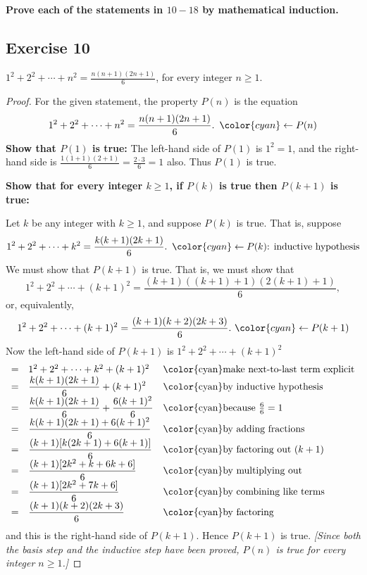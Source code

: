 \documentclass[14pt]{extarticle}
\newcommand{\dps}{\displaystyle}
\newcommand{\from}{\leftarrow}
\newcommand{\cy}{\color{cyan}}
\begin{document}
{\bf\cy Prove each of the statements in $10-18$ by mathematical induction.}

\subsection{Exercise 10}
$\dps 1^2 + 2^2 + \cdots + n^2 = \frac{n(n+1)(2n+1)}{6}$, for every integer $n \geq 1$.

\begin{proof}
    For the given statement, the property $P(n)$ is the equation
    \[
        1^2 + 2^2 + \cdots + n^2 = \frac{n(n+1)(2n+1)}{6}. \,\,\, {\cy \from P(n)}
    \]
    {\bf Show that $P(1)$ is true:} The left-hand side of $P(1)$ is $1^2 = 1$, and the right-hand side is $\dps \frac{1(1+1)(2+1)}{6} = \frac{2 \cdot 3}{6} = 1$ also. Thus $P(1)$ is true.

        {\bf Show that for every integer $k \geq 1$, if $P(k)$ is true then $P(k + 1)$ is true:}

    Let $k$ be any integer with $k \geq 1$, and suppose $P(k)$ is true. That is, suppose
    \[
        1^2 + 2^2 + \cdots + k^2 = \frac{k(k+1)(2k+1)}{6}. \,\,\, {\cy \from P(k) \text{: inductive hypothesis}}
    \]
    We must show that $P(k + 1)$ is true. That is, we must show that
    \[
        1^2 + 2^2 + \cdots + (k+1)^2 = \frac{(k+1)((k+1)+1)(2(k+1)+1)}{6},
    \]
    or, equivalently,
    \[
        1^2 + 2^2 + \cdots + (k+1)^2 = \frac{(k+1)(k+2)(2k+3)}{6}. \,\,{\cy \from P(k+1)}
    \]
    Now the left-hand side of $P(k + 1)$ is $1^2 + 2^2 + \cdots + (k+1)^2$
    \[
        \begin{array}{lll}
            = & 1^2 + 2^2 + \cdots + k^2 + (k+1)^2               & \text{\cy make next-to-last term explicit} \\
            = & \dps \frac{k(k+1)(2k+1)}{6} + (k+1)^2            & \text{\cy by inductive hypothesis}         \\
            = & \dps \frac{k(k+1)(2k+1)}{6} + \frac{6(k+1)^2}{6} & \text{\cy because $\frac{6}{6} = 1$}       \\
            = & \dps \frac{k(k+1)(2k+1) + 6(k+1)^2}{6}           & \text{\cy by adding fractions}             \\
            = & \dps \frac{(k+1)[k(2k+1) + 6(k+1)]}{6}           & \text{\cy by factoring out $(k+1)$}        \\
            = & \dps \frac{(k+1)[2k^2+k + 6k+6]}{6}              & \text{\cy by multiplying out}              \\
            = & \dps \frac{(k+1)[2k^2+7k+6]}{6}                  & \text{\cy by combining like terms}         \\
            = & \dps \frac{(k+1)(k+2)(2k+3)}{6}                  & \text{\cy by factoring}                    \\
        \end{array}
    \]
    and this is the right-hand side of $P(k + 1)$. Hence $P(k + 1)$ is true. {\it [Since both the basis step and the inductive step have been proved, $P(n)$ is true for every integer $n \geq 1$.]}
\end{proof}
\end{document}
